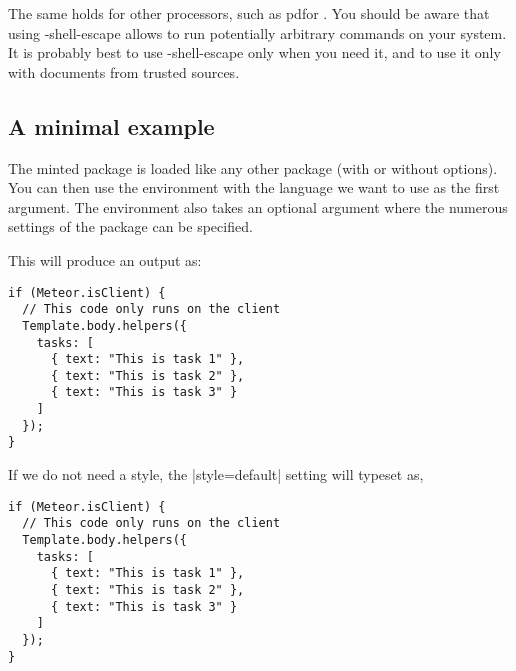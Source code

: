The same holds for other processors, such as pdf\latex or \xelatex.
You should be aware that using -shell-escape allows \latex to run potentially
arbitrary commands on your system. It is probably best to use -shell-escape
only when you need it, and to use it only with documents from trusted sources.

\subsection{A minimal example}   
 
The minted package is loaded like any other package (with or without options). 
You can then use the  environment with the language we want to use
as the first argument. The environment also takes an optional argument where the numerous
settings of the package can be specified.
 

This will produce an output as:
\medskip

\begin{verbatim}
if (Meteor.isClient) {
  // This code only runs on the client
  Template.body.helpers({
    tasks: [
      { text: "This is task 1" },
      { text: "This is task 2" },
      { text: "This is task 3" }
    ]
  });
}
\end{verbatim}

If we do not need a style, the |style=default| setting will typeset as,

\begin{verbatim}
if (Meteor.isClient) {
  // This code only runs on the client
  Template.body.helpers({
    tasks: [
      { text: "This is task 1" },
      { text: "This is task 2" },
      { text: "This is task 3" }
    ]
  });
}
\end{verbatim}

